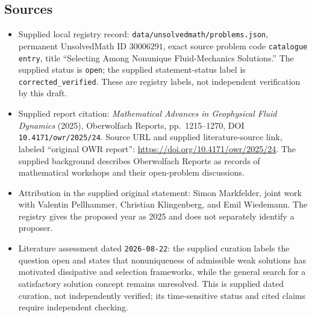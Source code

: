 \documentclass[11pt]{article}
\begin{document}
\subsection{Sources}
\begin{itemize}
\item Supplied local registry record: \texttt{data/unsolvedmath/problems.json}, permanent UnsolvedMath ID \(30006291\), exact source problem code \texttt{catalogue entry}, title ``Selecting Among Nonunique Fluid-Mechanics Solutions.'' The supplied status is \texttt{open}; the supplied statement-status label is \texttt{corrected\_verified}. These are registry labels, not independent verification by this draft.
\item Supplied report citation: \emph{Mathematical Advances in Geophysical Fluid Dynamics} (2025), Oberwolfach Reports, pp.\ 1215--1270, DOI \texttt{10.4171/owr/2025/24}. Source URL and supplied literature-source link, labeled ``original OWR report'': \url{https://doi.org/10.4171/owr/2025/24}. The supplied background describes Oberwolfach Reports as records of mathematical workshops and their open-problem discussions.
\item Attribution in the supplied original statement: Simon Markfelder, joint work with Valentin Pellhammer, Christian Klingenberg, and Emil Wiedemann. The registry gives the proposed year as 2025 and does not separately identify a proposer.
\item Literature assessment dated \texttt{2026-08-22}: the supplied curation labels the question open and states that nonuniqueness of admissible weak solutions has motivated dissipative and selection frameworks, while the general search for a satisfactory solution concept remains unresolved. This is supplied dated curation, not independently verified; its time-sensitive status and cited claims require independent checking.
\end{itemize}
\end{document}
